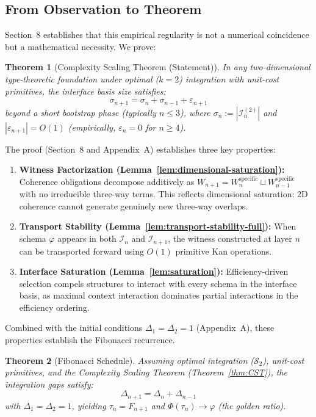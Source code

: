 \documentclass[11pt]{article}
\newtheorem{theorem}{Theorem}[section]
\theoremstyle{definition}
\theoremstyle{remark}
\begin{document}
\subsection{From Observation to Theorem}

Section~8 establishes that this empirical regularity is not a numerical coincidence but a mathematical
necessity. We prove:

\begin{theorem}[Complexity Scaling Theorem (Statement)]
In any two-dimensional type-theoretic foundation under optimal ($k=2$) integration with unit-cost
primitives, the interface basis size satisfies:
\[
\sigma_{n+1} = \sigma_n + \sigma_{n-1} + \varepsilon_{n+1}
\]
beyond a short bootstrap phase (typically $n \leq 3$), where $\sigma_n := |\mathcal{I}_n^{(2)}|$ and
$|\varepsilon_{n+1}| = O(1)$ (empirically, $\varepsilon_n = 0$ for $n \geq 4$).
\end{theorem}

The proof (Section~8 and Appendix~A) establishes three key properties:

\begin{enumerate}
\item \textbf{Witness Factorization (Lemma~\ref{lem:dimensional-saturation}):} Coherence obligations decompose
additively as $W_{n+1} = W_n^{\text{specific}} \sqcup W_{n-1}^{\text{specific}}$ with no irreducible three-way
terms. This reflects dimensional saturation: 2D coherence cannot generate genuinely new three-way
overlaps.

\item \textbf{Transport Stability (Lemma~\ref{lem:transport-stability-full}):} When schema $\varphi$ appears in both
$\mathcal{I}_n$ and $\mathcal{I}_{n+1}$, the witness constructed at layer $n$ can be transported forward using $O(1)$
primitive Kan operations.

\item \textbf{Interface Saturation (Lemma~\ref{lem:saturation}):} Efficiency-driven selection compels
structures to interact with every schema in the interface basis, as maximal context interaction
dominates partial interactions in the efficiency ordering.
\end{enumerate}

Combined with the initial conditions $\Delta_1 = \Delta_2 = 1$ (Appendix~A), these properties establish
the Fibonacci recurrence.

\begin{theorem}[Fibonacci Schedule]
\label{thm:fibonacci}
Assuming optimal integration ($\mathcal{S}_2$), unit-cost primitives, and the Complexity Scaling Theorem
(Theorem~\ref{thm:CST}), the integration gaps satisfy:
\[
\Delta_{n+1} = \Delta_n + \Delta_{n-1}
\]
with $\Delta_1 = \Delta_2 = 1$, yielding $\tau_n = F_{n+1}$ and $\Phi(\tau_n) \to \varphi$ (the golden ratio).
\end{theorem}
\end{document}
